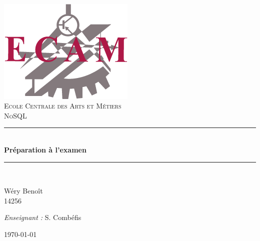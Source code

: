 \setlength{\parindent}{0cm}
\setlength{\parskip}{1ex plus 0.5ex minus 0.2ex}
\newcommand{\hsp}{\hspace{20pt}}
\newcommand{\HRule}{\rule{\linewidth}{0.5mm}}

\begin{titlepage}
  \begin{sffamily}
  \begin{center}

	\hsp\\[2cm]
	\includegraphics[scale=0.3]{images/ecam-logo.png}~\\[1.5cm]
   \textsc{\LARGE Ecole Centrale des Arts et Métiers}\\[2.5cm]

    \textsc{\Large NoSQL}\\[2cm]
%
    \HRule \\[0.4cm]
    { \huge \bfseries Préparation à l'examen\\[0.4cm] }

    \HRule \\[6cm]

    \begin{minipage}{0.4\textwidth}
      \begin{flushleft} \large
        Wéry Benoît\\
        14256\\
      \end{flushleft}
    \end{minipage}
    \begin{minipage}{0.4\textwidth}
      \begin{flushright} \large
        \textit{Enseignant :} S. Combéfis \\
      \end{flushright}
    \end{minipage}

    \vfill
%
    {\today}

  \end{center}
  \end{sffamily}
\end{titlepage}
